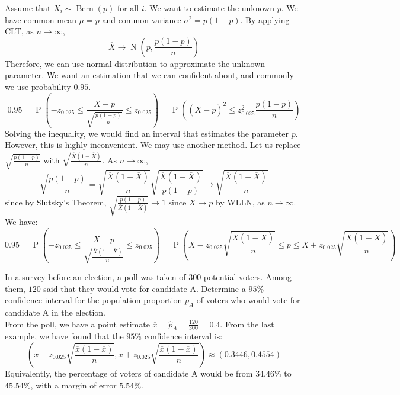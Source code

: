 \documentclass{huhtakm-template-book-v2}
\DeclareMathOperator{\prob}{P}
\DeclareMathOperator{\Bern}{Bern}
\DeclareMathOperator{\N}{N}
\begin{document}
\begin{eg}
	Assume that $X_{i}\sim\Bern(p)$ for all $i$. We want to estimate the unknown $p$. We have common mean $\mu=p$ and common variance $\sigma^{2}=p(1-p)$. By applying CLT, as $n\to\infty$,
	\begin{equation*}
		\overline{X}\to\N\left(p,\frac{p(1-p)}{n}\right)
	\end{equation*}
	Therefore, we can use normal distribution to approximate the unknown parameter. We want an estimation that we can confident about, and commonly we use probability $0.95$.
	\begin{equation*}
		0.95=\prob\left(-z_{0.025}\leq\frac{\overline{X}-p}{\sqrt{\frac{p(1-p)}{n}}}\leq z_{0.025}\right)=\prob\left((\overline{X}-p)^{2}\leq z_{0.025}^{2}\frac{p(1-p)}{n}\right)
	\end{equation*} 
	Solving the inequality, we would find an interval that estimates the parameter $p$. However, this is highly inconvenient. We may use another method. Let us replace $\sqrt{\frac{p(1-p)}{n}}$ with $\sqrt{\frac{\overline{X}(1-\overline{X})}{n}}$. As $n\to\infty$,
	\begin{equation*}
		\sqrt{\frac{p(1-p)}{n}}=\sqrt{\frac{\overline{X}(1-\overline{X})}{n}}\sqrt{\frac{\overline{X}(1-\overline{X})}{p(1-p)}}\to\sqrt{\frac{\overline{X}(1-\overline{X})}{n}}
	\end{equation*}
	since by Slutsky's Theorem, $\sqrt{\frac{p(1-p)}{\overline{X}(1-\overline{X})}}\to 1$ since $\overline{X}\to p$ by WLLN, as $n\to\infty$. We have:
	\begin{equation*}
		0.95=\prob\left(-z_{0.025}\leq\frac{\overline{X}-p}{\sqrt{\frac{\overline{X}(1-\overline{X})}{n}}}\leq z_{0.025}\right)=\prob\left(\overline{X}-z_{0.025}\sqrt{\frac{\overline{X}(1-\overline{X})}{n}}\leq p\leq\overline{X}+z_{0.025}\sqrt{\frac{\overline{X}(1-\overline{X})}{n}}\right)
	\end{equation*} 
\end{eg}
\begin{eg}
	In a survey before an election, a poll was taken of $300$ potential voters. Among them, $120$ said that they would vote for candidate A. Determine a $95\%$ confidence interval for the population proportion $p_{A}$ of voters who would vote for candidate A in the election.\\
	From the poll, we have a point estimate $\overline{x}=\hat{p}_{A}=\frac{120}{300}=0.4$. From the last example, we have found that the $95\%$ confidence interval is:
	\begin{equation*}
		\left(\overline{x}-z_{0.025}\sqrt{\frac{\overline{x}(1-\overline{x})}{n}},\overline{x}+z_{0.025}\sqrt{\frac{\overline{x}(1-\overline{x})}{n}}\right)\approx(0.3446,0.4554)
	\end{equation*}
	Equivalently, the percentage of voters of candidate A would be from $34.46\%$ to $45.54\%$, with a margin of error $5.54\%$.
\end{eg}
\end{document}

